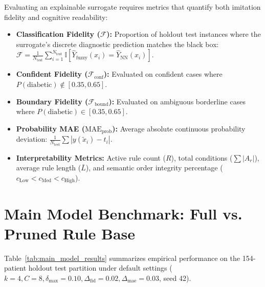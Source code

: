\documentclass{report}
\begin{document}
Evaluating an explainable surrogate requires metrics that quantify both imitation fidelity and cognitive readability:
\begin{itemize}
    \setlength{\itemsep}{0pt}
    \setlength{\parskip}{0pt}
    \item \textbf{Classification Fidelity ($\mathcal{F}$):} Proportion of holdout test instances where the surrogate's discrete diagnostic prediction matches the black box: $\mathcal{F} = \frac{1}{N_{\text{test}}} \sum_{i=1}^{N_{\text{test}}} \mathbb{I}[\hat{Y}_{\text{fuzzy}}(x_i) = \hat{Y}_{\text{NN}}(x_i)]$.
    \item \textbf{Confident Fidelity ($\mathcal{F}_{\text{conf}}$):} Evaluated on confident cases where $P(\text{diabetic}) \notin [0.35, 0.65]$.
    \item \textbf{Boundary Fidelity ($\mathcal{F}_{\text{bound}}$):} Evaluated on ambiguous borderline cases where $P(\text{diabetic}) \in [0.35, 0.65]$.
    \item \textbf{Probability MAE ($\text{MAE}_{\text{prob}}$):} Average absolute continuous probability deviation: $\frac{1}{N_{\text{test}}} \sum |y(\tilde{x}_i) - t_i|$.
    \item \textbf{Interpretability Metrics:} Active rule count ($R$), total conditions ($\sum |A_r|$), average rule length ($\bar{L}$), and semantic order integrity percentage ($c_{\text{Low}} < c_{\text{Med}} < c_{\text{High}}$).
\end{itemize}

\section{Main Model Benchmark: Full vs. Pruned Rule Base}

Table~\ref{tab:main_model_results} summarizes empirical performance on the 154-patient holdout test partition under default settings ($k=4, C=8, \delta_{\max}=0.10, \Delta_{\text{fid}}=0.02, \Delta_{\text{mae}}=0.03$, seed 42).
\end{document}
